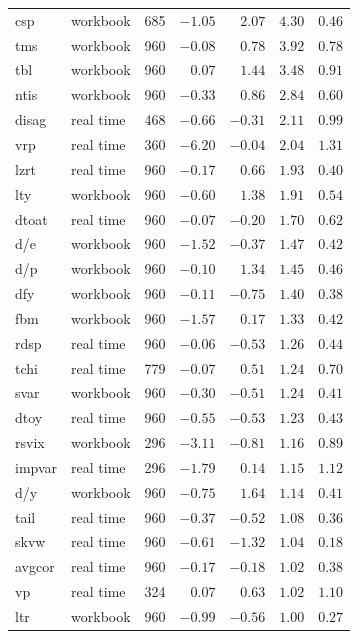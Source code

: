 \begin{tabular}{llrrrrr}
    csp & workbook & 685 & $-1.05$ & $2.07$ & $4.30$ & $0.46$ \\
    tms & workbook & 960 & $-0.08$ & $0.78$ & $3.92$ & $0.78$ \\
    tbl & workbook & 960 & $0.07$ & $1.44$ & $3.48$ & $0.91$ \\
    ntis & workbook & 960 & $-0.33$ & $0.86$ & $2.84$ & $0.60$ \\
    disag & real time & 468 & $-0.66$ & $-0.31$ & $2.11$ & $0.99$ \\
    vrp & real time & 360 & $-6.20$ & $-0.04$ & $2.04$ & $1.31$ \\
    lzrt & real time & 960 & $-0.17$ & $0.66$ & $1.93$ & $0.40$ \\
    lty & workbook & 960 & $-0.60$ & $1.38$ & $1.91$ & $0.54$ \\
    dtoat & real time & 960 & $-0.07$ & $-0.20$ & $1.70$ & $0.62$ \\
    d/e & workbook & 960 & $-1.52$ & $-0.37$ & $1.47$ & $0.42$ \\
    d/p & workbook & 960 & $-0.10$ & $1.34$ & $1.45$ & $0.46$ \\
    dfy & workbook & 960 & $-0.11$ & $-0.75$ & $1.40$ & $0.38$ \\
    fbm & workbook & 960 & $-1.57$ & $0.17$ & $1.33$ & $0.42$ \\
    rdsp & real time & 960 & $-0.06$ & $-0.53$ & $1.26$ & $0.44$ \\
    tchi & real time & 779 & $-0.07$ & $0.51$ & $1.24$ & $0.70$ \\
    svar & workbook & 960 & $-0.30$ & $-0.51$ & $1.24$ & $0.41$ \\
    dtoy & real time & 960 & $-0.55$ & $-0.53$ & $1.23$ & $0.43$ \\
    rsvix & workbook & 296 & $-3.11$ & $-0.81$ & $1.16$ & $0.89$ \\
    impvar & real time & 296 & $-1.79$ & $0.14$ & $1.15$ & $1.12$ \\
    d/y & workbook & 960 & $-0.75$ & $1.64$ & $1.14$ & $0.41$ \\
    tail & real time & 960 & $-0.37$ & $-0.52$ & $1.08$ & $0.36$ \\
    skvw & real time & 960 & $-0.61$ & $-1.32$ & $1.04$ & $0.18$ \\
    avgcor & real time & 960 & $-0.17$ & $-0.18$ & $1.02$ & $0.38$ \\
    vp & real time & 324 & $0.07$ & $0.63$ & $1.02$ & $1.10$ \\
    ltr & workbook & 960 & $-0.99$ & $-0.56$ & $1.00$ & $0.27$ \\

\end{tabular}
